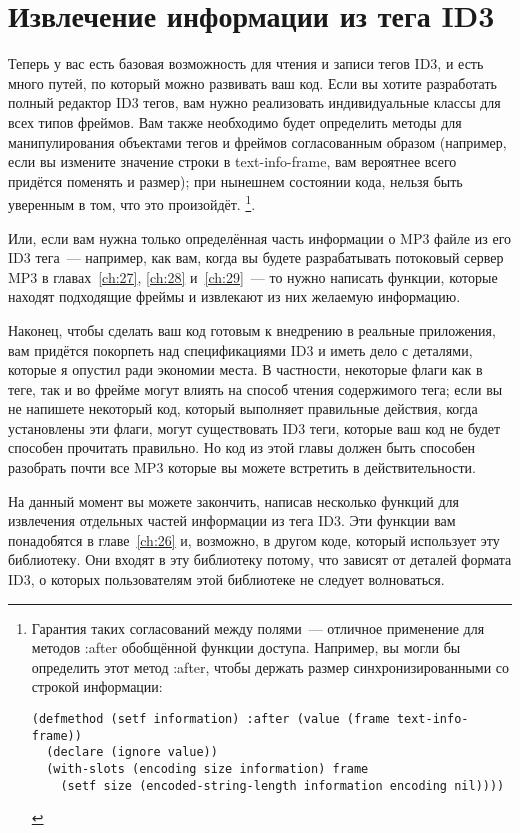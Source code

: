 \section{Извлечение информации из тега ID3}

Теперь у вас есть базовая возможность для чтения и записи тегов ID3, и есть много путей,
по который можно развивать ваш код. Если вы хотите разработать полный редактор ID3 тегов,
вам нужно реализовать индивидуальные классы для всех типов фреймов. Вам также необходимо
будет определить методы для манипулирования объектами тегов и фреймов согласованным
образом (например, если вы измените значение строки в text-info-frame, вам вероятнее всего
придётся поменять и размер); при нынешнем состоянии кода, нельзя быть уверенным в том, что
это произойдёт. \footnote{Гарантия таких согласований между полями~--- отличное применение
  для методов :after обобщённой функции доступа. Например, вы могли бы определить этот
  метод :after, чтобы держать размер синхронизированными со строкой информации:

\begin{lstlisting}
(defmethod (setf information) :after (value (frame text-info-frame))
  (declare (ignore value))
  (with-slots (encoding size information) frame
    (setf size (encoded-string-length information encoding nil))))
\end{lstlisting}
}.

Или, если вам нужна только определённая часть информации о MP3 файле из его ID3 тега~---
например, как вам, когда вы будете разрабатывать потоковый сервер MP3 в
главах~\ref{ch:27}, \ref{ch:28} и~\ref{ch:29}~--- то нужно написать функции, которые
находят подходящие фреймы и извлекают из них желаемую информацию.

Наконец, чтобы сделать ваш код готовым к внедрению в реальные приложения, вам придётся
покорпеть над спецификациями ID3 и иметь дело с деталями, которые я опустил ради экономии
места. В частности, некоторые флаги как в теге, так и во фрейме могут влиять на способ
чтения содержимого тега; если вы не напишете некоторый код, который выполняет правильные
действия, когда установлены эти флаги, могут существовать ID3 теги, которые ваш код не
будет способен прочитать правильно. Но код из этой главы должен быть способен разобрать
почти все MP3 которые вы можете встретить в действительности.

На данный момент вы можете закончить, написав несколько функций для извлечения отдельных
частей информации из тега ID3. Эти функции вам понадобятся в главе~\ref{ch:26} и,
возможно, в другом коде, который использует эту библиотеку. Они входят в эту библиотеку
потому, что зависят от деталей формата ID3, о которых пользователям этой библиотеке не
следует волноваться.

